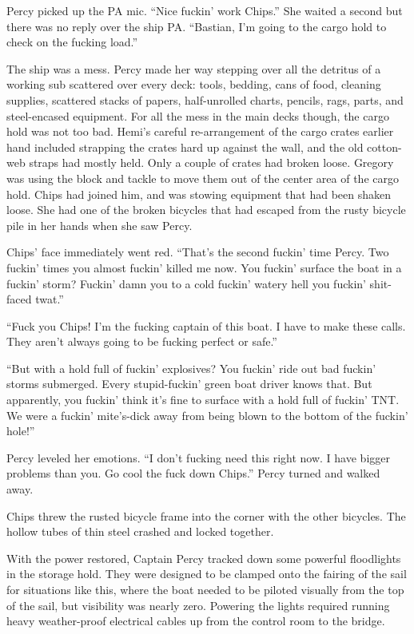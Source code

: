 \documentclass[
]{scrbook}
\begin{document}
Percy picked up the PA mic. ``Nice fuckin' work Chips.'' She waited a
second but there was no reply over the ship PA. ``Bastian, I'm going to
the cargo hold to check on the fucking load.''

The ship was a mess. Percy made her way stepping over all the detritus
of a working sub scattered over every deck: tools, bedding, cans of
food, cleaning supplies, scattered stacks of papers, half-unrolled
charts, pencils, rags, parts, and steel-encased equipment. For all the
mess in the main decks though, the cargo hold was not too bad. Hemi's
careful re-arrangement of the cargo crates earlier hand included
strapping the crates hard up against the wall, and the old cotton-web
straps had mostly held. Only a couple of crates had broken loose.
Gregory was using the block and tackle to move them out of the center
area of the cargo hold. Chips had joined him, and was stowing equipment
that had been shaken loose. She had one of the broken bicycles that had
escaped from the rusty bicycle pile in her hands when she saw Percy.

Chips' face immediately went red. ``That's the second fuckin' time
Percy. Two fuckin' times you almost fuckin' killed me now. You fuckin'
surface the boat in a fuckin' storm? Fuckin' damn you to a cold fuckin'
watery hell you fuckin' shit-faced twat.''

``Fuck you Chips! I'm the fucking captain of this boat. I have to make
these calls. They aren't always going to be fucking perfect or safe.''

``But with a hold full of fuckin' explosives? You fuckin' ride out bad
fuckin' storms submerged. Every stupid-fuckin' green boat driver knows
that. But apparently, you fuckin' think it's fine to surface with a hold
full of fuckin' TNT. We were a fuckin' mite's-dick away from being blown
to the bottom of the fuckin' hole!''

Percy leveled her emotions. ``I don't fucking need this right now. I
have bigger problems than you. Go cool the fuck down Chips.'' Percy
turned and walked away.

Chips threw the rusted bicycle frame into the corner with the other
bicycles. The hollow tubes of thin steel crashed and locked together.

With the power restored, Captain Percy tracked down some powerful
floodlights in the storage hold. They were designed to be clamped onto
the fairing of the sail for situations like this, where the boat needed
to be piloted visually from the top of the sail, but visibility was
nearly zero. Powering the lights required running heavy weather-proof
electrical cables up from the control room to the bridge.
\end{document}
